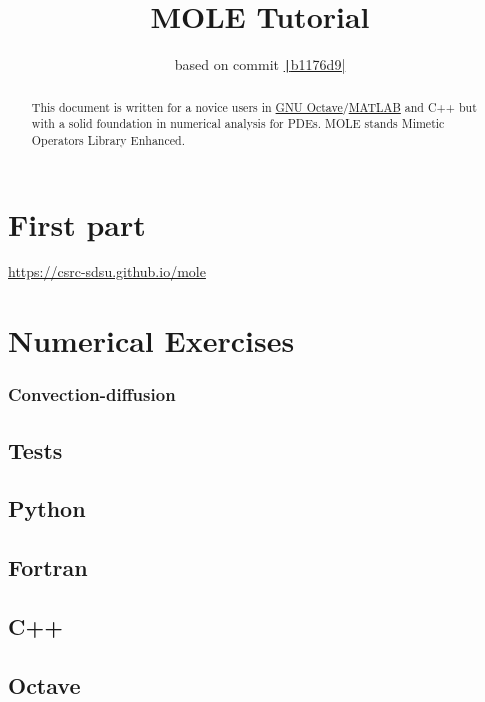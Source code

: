 \documentclass[a4paper,abstract=true]{scrreprt}
\title{\color{DarkBlue}MOLE Tutorial}
\author{based on commit \href{https://github.com/csrc-sdsu/mole/tree/b1176d9969e807fb62bed8fee28bc0eb9648a93a}{\texttt|b1176d9|}}
\begin{document}
\maketitle

\begin{abstract}
    This document is written for a novice users in
    \href{https://octave.org}{GNU Octave}/\href{https://www.mathworks.com/products/matlab.html}{MATLAB}
    and C++ but with a solid
    foundation in numerical analysis for PDEs.
    MOLE stands Mimetic Operators Library Enhanced.
\end{abstract}

\part{First part}

\url{https://csrc-sdsu.github.io/mole}

\part{Numerical Exercises}

\section{Convection-diffusion}

\chapter{Tests}

\chapter{Python}

\chapter{Fortran}

\chapter{C++}

\chapter{Octave}
\end{document}

